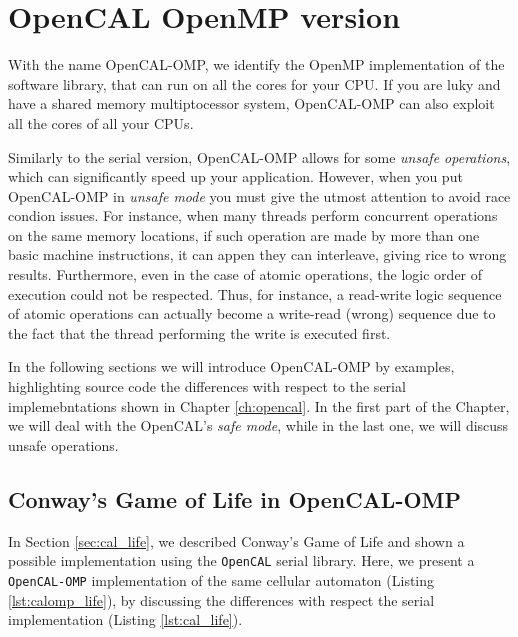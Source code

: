 \chapter{OpenCAL OpenMP version}\label{ch:opencal-omp}

With the name OpenCAL-OMP, we identify the OpenMP implementation of
the software library, that can run on all the cores for your CPU. If
you are luky and have a shared memory multiptocessor system,
OpenCAL-OMP can also exploit all the cores of all your CPUs.

Similarly to the serial version, OpenCAL-OMP allows for some
\emph{unsafe operations}, which can significantly speed up your
application. However, when you put OpenCAL-OMP in \emph{unsafe mode}
you must give the utmost attention to avoid race condion issues. For
instance, when many threads perform concurrent operations on the same
memory locations, if such operation are made by more than one basic
machine instructions, it can appen they can interleave, giving rice to
wrong results. Furthermore, even in the case of atomic operations, the
logic order of execution could not be respected. Thus, for instance, a
read-write logic sequence of atomic operations can actually become a
write-read (wrong) sequence due to the fact that the thread performing
the write is executed first.

In the following sections we will introduce OpenCAL-OMP by examples,
highlighting source code the differences with respect to the serial
implemebntations shown in Chapter \ref{ch:opencal}. In the first part of
the Chapter, we will deal with the OpenCAL's \emph{safe mode}, while in
the last one, we will discuss unsafe operations.

\section{Conway's Game of Life in OpenCAL-OMP}

In Section \ref{sec:cal_life}, we described Conway's Game of Life and
shown a possible implementation using the \verb'OpenCAL' serial
library. Here, we present a \verb'OpenCAL-OMP' implementation of the
same cellular automaton (Listing \ref{lst:calomp_life}), by discussing
the differences with respect the serial implementation (Listing
\ref{lst:cal_life}).



